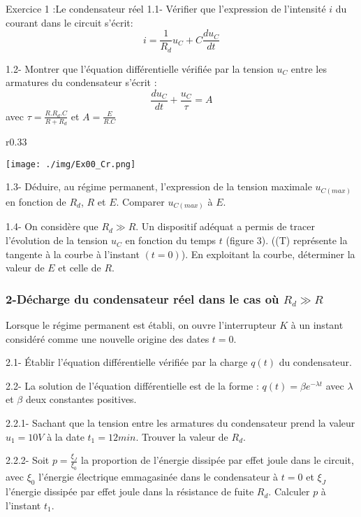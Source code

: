 \documentclass[12pt, french]{article}
\begin{document}
\begin{Box2}{Exercice 1 :Le condensateur réel}
	1.1- Vérifier que l'expression de l'intensité $i$ du courant dans le circuit s'écrit:
	\[ i = \frac{1}{R_d}u_C + C\frac{du_C}{dt} \]

	1.2- Montrer que l'équation différentielle vérifiée par la tension $u_C$ entre les armatures du condensateur s'écrit :
	\[ \frac{du_C}{dt} + \frac{u_C}{\tau} = A \]
	avec $\tau = \frac{R.R_d.C}{R+R_d}$ et $A = \frac{E}{R.C}$

	\begin{wrapfigure}[5]{r}{0.33\textwidth}
		\begin{center}
			\vspace{-3cm}
			\texttt{[image: ./img/Ex00\_Cr.png]}
		\end{center}
	\end{wrapfigure}


	1.3- Déduire, au régime permanent, l'expression de la tension maximale $u_{C(max)}$ en fonction de $R_d$, $R$ et $E$. Comparer $u_{C(max)}$ à $E$.

	1.4- On considère que $R_d \gg R$. Un dispositif adéquat a permis de tracer l'évolution de la tension $u_C$ en fonction du temps $t$ (figure 3). ((T) représente la tangente à la courbe à l'instant $(t=0)$). En exploitant la courbe, déterminer la valeur de $E$ et celle de $R$.
	\subsubsection*{2-Décharge du condensateur réel dans le cas où $R_d \gg R$}
	Lorsque le régime permanent est établi, on ouvre l'interrupteur $K$ à un instant considéré comme une nouvelle origine des dates $t=0$.

	2.1- Établir l'équation différentielle vérifiée par la charge $q(t)$ du condensateur.

	2.2- La solution de l'équation différentielle est de la forme : $q(t)=\beta e^{-\lambda t}$ avec $\lambda$ et $\beta$ deux constantes positives.

	2.2.1- Sachant que la tension entre les armatures du condensateur prend la valeur $u_1=10V$ à la date $t_1=12min$. Trouver la valeur de $R_d$.

	2.2.2- Soit $p=\frac{\xi_J}{\xi_0}$ la proportion de l'énergie dissipée par effet joule dans le circuit, avec $\xi_0$ l'énergie électrique emmagasinée dans le condensateur à $t=0$ et $\xi_J$ l'énergie dissipée par effet joule dans la résistance de fuite $R_d$. Calculer $p$ à l'instant $t_1$.



\end{Box2}
\end{document}
